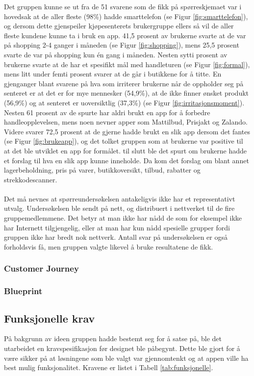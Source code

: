 Det gruppen kunne se ut fra de 51 svarene som de fikk på spørreskjemaet var i hovedsak at de aller fleste (98\%) hadde smarttelefon (se Figur \ref{fig:smarttelefon}), og dersom dette gjenspeiler kjøpesenterets brukergruppe ellers så vil de aller fleste kundene kunne ta i bruk en app. 41,5 prosent av brukerne svarte at de var på shopping 2-4 ganger i måneden (se Figur \ref{fig:shopping}), mens 25,5 prosent svarte de var på shopping kun én gang i måneden. Nesten sytti prosent av brukerne svarte at de har et spesifikt mål med handleturen (se Figur \ref{fig:formal}), mens litt under femti prosent svarer at de går i butikkene for å titte. En gjenganger blant svarene på hva som irriterer brukerne når de oppholder seg på senteret er at det er for mye mennesker (54,9\%), at de ikke finner ønsket produkt (56,9\%) og at senteret er uoversiktlig (37,3\%) (se Figur \ref{fig:irritasjonsmoment}). Nesten 61 prosent av de spurte har aldri brukt en app for å forbedre handleopplevelsen, mens noen nevner apper som Mattilbud, Prisjakt og Zalando. Videre svarer 72,5 prosent at de gjerne hadde brukt en slik app dersom det fantes (se Figur \ref{fig:brukeapp}), og det tolket gruppen som at brukerne var positive til at det ble utviklet en app for formålet. til slutt ble det spurt om brukerne hadde et forslag til hva en slik app kunne inneholde. Da kom det forslag om blant annet lagerbeholdning, pris på varer, butikkoversikt, tilbud, rabatter og strekkodescanner.
\\\\
Det må nevnes at spørreundersøkelsen antakeligvis ikke har et representativt utvalg. Undersøkelsen ble sendt på nett, og distribuert i nettverket til de fire gruppemedlemmene. Det betyr at man ikke har nådd de som for eksempel ikke har Internett tilgjengelig, eller at man har kun nådd spesielle grupper fordi gruppen ikke har bredt nok nettverk. Antall svar på undersøkelsen er også forholdsvis få, men gruppen valgte likevel å bruke resultatene de fikk. 

\subsubsection{Customer Journey}

\subsubsection{Blueprint}

\subsection{Funksjonelle krav}
På bakgrunn av ideen gruppen hadde bestemt seg for å satse på, ble det utarbeidet en kravspesifikasjon før designet ble påbegynt. Dette ble gjort for å være sikker på at løsningene som ble valgt var gjennomtenkt og at appen ville ha best mulig funksjonalitet. Kravene er listet i Tabell \ref{tab:funksjonelle}.

